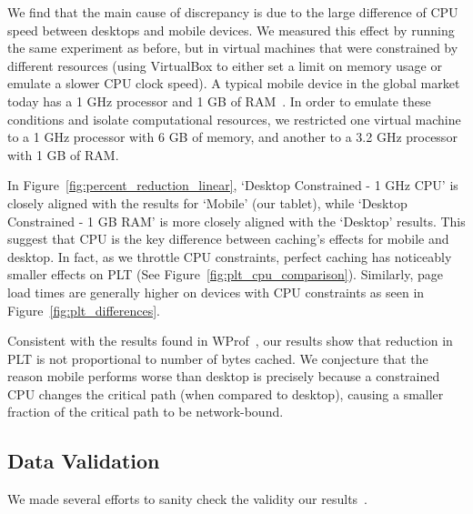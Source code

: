 We find that the main cause of discrepancy is due to the large difference of CPU speed between desktops and mobile devices. 
We measured this effect by running the same experiment as before, but in virtual machines that were constrained by different resources (using VirtualBox to either set a limit on memory usage or emulate a slower CPU clock speed).
A typical mobile device in the global market today has a 1 GHz processor and 1 GB of RAM~\cite{mobile-stats}. In order to emulate these conditions and isolate computational resources, we restricted one virtual machine to a 1 GHz processor with 6 GB of memory, and another to a 3.2 GHz processor with 1 GB of RAM.

In Figure~\ref{fig:percent_reduction_linear}, `Desktop Constrained - 1 GHz CPU' is closely aligned with the results for `Mobile' (our tablet), while `Desktop Constrained - 1 GB RAM' is more closely aligned with the `Desktop' results.
This suggest that CPU is the key difference between caching's effects for mobile and desktop.
In fact, as we throttle CPU constraints, perfect caching has noticeably smaller effects on PLT (See Figure~\ref{fig:plt_cpu_comparison}). Similarly, page load times are generally higher on devices with CPU constraints as seen in Figure~\ref{fig:plt_differences}.

Consistent with the results found in WProf~\cite{wang2013demystifying}, our results show that reduction in PLT is not proportional to number of bytes cached. We conjecture that the reason mobile performs worse than desktop is precisely because a constrained CPU changes the critical path (when compared to desktop), causing a smaller fraction of the critical path to be network-bound. 


\subsection{Data Validation}
\label{subsec:validation}
We made several efforts to sanity check the validity our results~\cite{sanity-checks}. 

